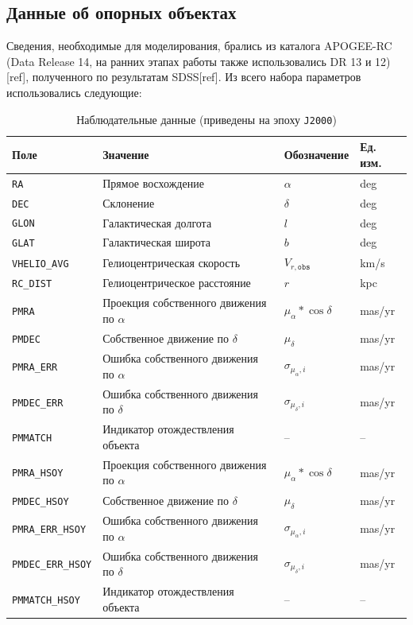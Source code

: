 \documentclass{matmex-diploma-custom}
\begin{document}
\subsection{Данные об опорных объектах}
Сведения, необходимые для моделирования, брались из каталога APOGEE-RC (Data Release 14, на ранних этапах работы также использовались DR 13 и 12)[ref], полученного по результатам SDSS[ref]. Из всего набора параметров использовались следующие: 
\begin{table}[ht]
\centering
\caption{Наблюдательные данные (приведены на эпоху \texttt{J2000})}
\begin{tabular}{|l|l|l|l|}
\hline
\textbf{Поле} & \textbf{Значение} & \textbf{Обозначение} & \textbf{Ед. изм.} \\
\hline
\texttt{RA} & Прямое восхождение & $\alpha$ & deg \\
\texttt{DEC} & Склонение & $\delta$ & deg \\
\texttt{GLON} & Галактическая долгота & $l$ & deg \\
\texttt{GLAT} & Галактическая широта & $b$ & deg \\
\hline
\texttt{VHELIO\_AVG} & Гелиоцентрическая скорость & $V_{r, \texttt{obs}}$ & km/s \\
\texttt{RC\_DIST} & Гелиоцентрическое расстояние & $r$ & kpc \\
\hline
\texttt{PMRA} & Проекция собственного движения по $\alpha$  & $\mu_{\alpha}* \cos{\delta}$ & mas/yr \\
\texttt{PMDEC} & Собственное движение по $\delta$  & $\mu_{\delta}$ & mas/yr \\
\texttt{PMRA\_ERR} & Ошибка собственного движения по $\alpha$  & $\sigma_{\mu_{\alpha}, i}$ & mas/yr \\
\texttt{PMDEC\_ERR} & Ошибка собственного движения по $\delta$  & $\sigma_{\mu_{\delta}, i}$ & mas/yr \\
\texttt{PMMATCH} & Индикатор отождествления объекта  & -- & -- \\
\hline
\texttt{PMRA\_HSOY} & Проекция собственного движения по $\alpha$  & $\mu_{\alpha}* \cos{\delta}$ & mas/yr \\
\texttt{PMDEC\_HSOY} & Собственное движение по $\delta$  & $\mu_{\delta}$ & mas/yr \\
\texttt{PMRA\_ERR\_HSOY} & Ошибка собственного движения по $\alpha$  & $\sigma_{\mu_{\alpha}, i}$ & mas/yr \\
\texttt{PMDEC\_ERR\_HSOY} & Ошибка собственного движения по $\delta$  & $\sigma_{\mu_{\delta}, i}$ & mas/yr \\
\texttt{PMMATCH\_HSOY} & Индикатор отождествления объекта  & -- & -- \\
\hline
\end{tabular}
\end{table}
\end{document}
